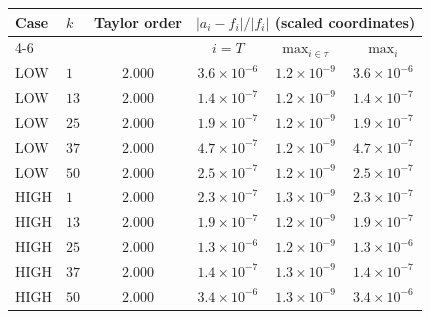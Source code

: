 \begin{tabular}{@{}llcccc@{}}
\toprule
Case & $k$ & Taylor order & \multicolumn{3}{c}{$|a_i-f_i|/|f_i|$ (scaled coordinates)}\\
\cmidrule(l){4-6}
 & & & $i=T$ & $\max_{i\in\tau}$ & $\max_i$\\
\midrule
LOW & $1$ & $2.000$ & $3.6\times10^{-6}$ & $1.2\times10^{-9}$ & $3.6\times10^{-6}$\\
LOW & $13$ & $2.000$ & $1.4\times10^{-7}$ & $1.2\times10^{-9}$ & $1.4\times10^{-7}$\\
LOW & $25$ & $2.000$ & $1.9\times10^{-7}$ & $1.2\times10^{-9}$ & $1.9\times10^{-7}$\\
LOW & $37$ & $2.000$ & $4.7\times10^{-7}$ & $1.2\times10^{-9}$ & $4.7\times10^{-7}$\\
LOW & $50$ & $2.000$ & $2.5\times10^{-7}$ & $1.2\times10^{-9}$ & $2.5\times10^{-7}$\\
HIGH & $1$ & $2.000$ & $2.3\times10^{-7}$ & $1.3\times10^{-9}$ & $2.3\times10^{-7}$\\
HIGH & $13$ & $2.000$ & $1.9\times10^{-7}$ & $1.2\times10^{-9}$ & $1.9\times10^{-7}$\\
HIGH & $25$ & $2.000$ & $1.3\times10^{-6}$ & $1.2\times10^{-9}$ & $1.3\times10^{-6}$\\
HIGH & $37$ & $2.000$ & $1.4\times10^{-7}$ & $1.3\times10^{-9}$ & $1.4\times10^{-7}$\\
HIGH & $50$ & $2.000$ & $3.4\times10^{-6}$ & $1.3\times10^{-9}$ & $3.4\times10^{-6}$\\
\bottomrule
\end{tabular}
